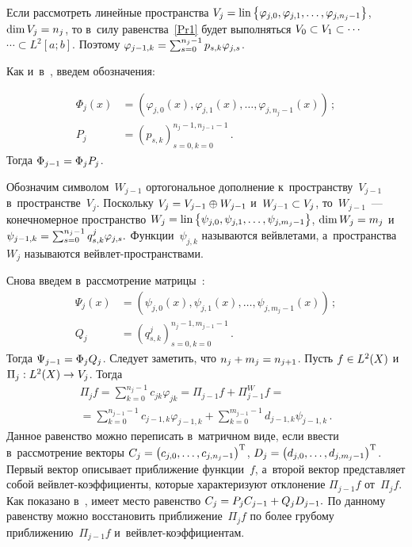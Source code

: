 \begin{multicols}{2}
Если рассмотреть линейные пространства $ V_{j} \hm= \mathrm{lin}
\left\{\varphi _{j,0} ,\varphi _{j,1} ,\ldots,\varphi _{j,n_{j} -1} \right\}$,
$\dim V_{j} \hm=n_{j}$, то  в~силу равенства~\eqref{Pr1}  будет выполняться 
$V_{0} \hm\subset V_{1} \subset \cdots$\linebreak $\cdots \subset L^{2} \left[a;b\right]$. 
Поэтому $\varphi _{j-1,k} \hm=\sum\nolimits _{s=0}^{n_{j} -1}p_{s,k} \varphi _{j,s}$. 

Как и~в~\cite{ArticleFinkelstein}, введем обозначения: 

\noindent
\begin{align*}
\Phi _{j} (x)&=
\left(\varphi _{j,0} (x),\varphi _{j,1} (x),\ldots,\varphi _{j,n_{j} -1} (x)\right)\,;\\
{P}_{j} &=\left(p_{s,k} \right)_{s=0, k=0}^{n_{j} -1, n_{j-1} -1}\,.
\end{align*}
Тогда $\Phi _{j-1}\hm =\Phi _{j} {P}_{j} $. 

\pagebreak

Обозначим символом~$W_{j-1} $ 
ортогональное дополнение к~пространству~$V_{j-1} $ в~пространстве~$V_{j}$. 
Поскольку $V_{j}\hm =V_{j-1} \oplus W_{j-1} $ и~$W_{j-1} \hm\subset V_{j} $, 
то~$W_{j-1} $~--- конечномерное пространство $ W_{j} \hm = 
\mathrm{lin} \left\{\psi _{j,0} ,\psi _{j,1} ,\ldots,\psi _{j,m_{j} -1} \right\}$,
$\dim W_{j} \hm=m_{j}$ и~$\psi _{j-1,k} \hm=
\sum\nolimits_{s=0}^{n_{j} -1}q_{s,k}^{j} \varphi _{j,s}.$ 
Функции~$\psi _{j,k} $ называются вейвлетами, а~пространства~$W_{j} $ 
называются вейв\-лет-про\-стран\-ст\-вами.

Снова введем в~рассмотрение матрицы~\cite{ArticleFinkelstein}:
\begin{align*}
\Psi _{j} (x)&=\left(\psi _{j,0} (x),\psi _{j,1} (x),\ldots,\psi_{j,m_{j} -1}
 (x)\right)\,;\\
{Q}_{j}&=\left(q_{s,k}^{j} \right)_{s=0, k=0}^{n_{j}-1,m_{j-1}-1}\,.
\end{align*}
Тогда $\Psi _{j-1} \hm=\Phi _{j} {Q}_{j} $. 
Следует заметить, что $n_{j} \hm+m_{j} \hm=n_{j+1} $.
Пусть $f\hm\in {L}^{2} (X)$ и~$\Pi _{j} : {L}^{2} (X)\hm\to V_{j} $. Тогда
\begin{multline*}
\Pi _{j} f=\sum\limits_{k=0}^{n_{j} -1}c_{jk} \varphi _{jk}  =
\Pi _{j-1} f+\Pi _{j-1}^{W} f={}\\
{}=\sum\limits_{k=0}^{n_{j-1} -1}c_{j-1,k} \varphi _{j-1,k}  +
\sum\limits_{k=0}^{m_{j-1} -1}d_{j-1,k} \psi _{j-1,k}\,.
\end{multline*}
Данное равенство можно переписать в~матричном виде, если ввести в~рассмотрение 
векторы ${C}_{j} \hm=\left(c_{j,0} ,\dots,c_{j,n_{j} -1} \right)^{\mathrm{T}}$,
${D}_{j} \hm=\left(d_{j,0} ,\dots,d_{j,m_{j} -1} \right)^{\mathrm{T}}$. 
Первый вектор описывает приближение функции~$f$, а~второй вектор представляет 
собой вейв\-лет-ко\-эф\-фи\-ци\-ен\-ты, которые характеризуют отклонение
$\Pi _{j-1} f$ от~$\Pi _{j} f$. Как показано в~\cite{ArticleFinkelstein}, 
имеет место равенство
${C}_{j} \hm={P}_{j} {C}_{j-1} \hm+{Q}_{j} {D}_{j-1}.$
По данному равенству можно восстановить приближение~$\Pi _{j} f$ 
по более грубому приближению~$\Pi _{j-1} f$ и~вейв\-лет-ко\-эф\-фи\-ци\-ен\-там.


\end{multicols}
